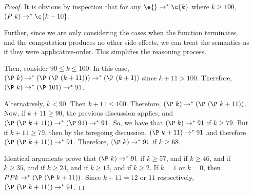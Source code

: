 \documentclass{article}
\begin{document}
\begin{proof}

It is obvious by inspection that for any $\e{} \rightarrow^* \c{k}$
where $k \geq 100$, $(P\ k) \rightarrow^* \c{k-10}$.  

Further, since we are only considering the cases when the function
terminates, and the computation produces no other side effects, we can
treat the semantics as if they were applicative-order.  This
simplifies the reasoning process. 


Then, consider $90 \leq k \leq 100$.  In this case, $\PP{k}
\red \PP{\PP {(k+11)}} \red \PP{(k+1)}$ since $k+11>100$.  Therefore,
$\PP{k} \red \PP{101} \red 91$.

Alternatively, $k < 90$.  Then $k+11 \leq 100$.  Therefore, $\PP{k}
\red \PP{\PP{k+11}}$.  Now, if $k+11 \geq 90$, the previous discussion
applies, and $\PP{\PP{k+11}} \red \PP{91} \red 91$.  So, we have that
$\PP{k} \red 91$ if $k \geq 79$.  But if $k+11 \geq 79$, then  by
the foregoing discussion, $\PP{k+11} \red 91$ and therefore
$\PP{\PP{k+11}} \red 91$.  Therefore, $\PP{k} \red 91$ if $k \geq 68$.

Identical arguments prove that $\PP{k} \red 91$ if $k \geq 57$, and if
$k \geq 46$, and if $k \geq 35$, and if $k \geq 24$, and if $k \geq
13$, and if $k \geq 2$.  If $k = 1$ or $k = 0$, then $PP{k} \red
\PP{\PP{k+11}}$.  Since $k+11 = 12$ or $11$ respectively,
$\PP{\PP{k+11}} \red 91$.  

\end{proof}
\end{document}

